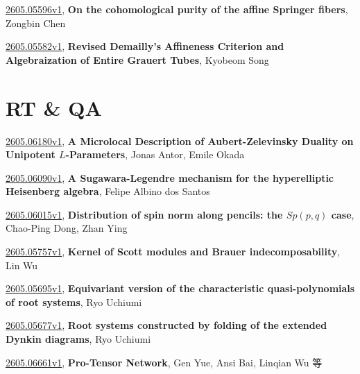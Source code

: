 \documentclass[9pt, a4paper]{article}
\theoremstyle{plain}
\theoremstyle{definition}
\theoremstyle{remark}
\newcommand{\arxiv}[3]{\href{https://arxiv.org/abs/#1}{#1}, \textbf{\textcolor{arxivblue}{#2}}, #3}
\begin{document}
\arxiv{2605.05596v1}{On the cohomological purity of the affine Springer fibers}{Zongbin Chen}

\arxiv{2605.05582v1}{Revised Demailly's Affineness Criterion and Algebraization of Entire Grauert Tubes}{Kyobeom Song}


\section{RT \& QA}
\arxiv{2605.06180v1}{A Microlocal Description of Aubert-Zelevinsky Duality on Unipotent $L$-Parameters}{Jonas Antor, Emile Okada}

\arxiv{2605.06090v1}{A Sugawara-Legendre mechanism for the hyperelliptic Heisenberg algebra}{Felipe Albino dos Santos}

\arxiv{2605.06015v1}{Distribution of spin norm along pencils: the $Sp(p, q)$ case}{Chao-Ping Dong, Zhan Ying}

\arxiv{2605.05757v1}{Kernel of Scott modules and Brauer indecomposability}{Lin Wu}

\arxiv{2605.05695v1}{Equivariant version of the characteristic quasi-polynomials of root systems}{Ryo Uchiumi}

\arxiv{2605.05677v1}{Root systems constructed by folding of the extended Dynkin diagrams}{Ryo Uchiumi}

\arxiv{2605.06661v1}{Pro-Tensor Network}{Gen Yue, Ansi Bai, Linqian Wu 等}

\end{document}
